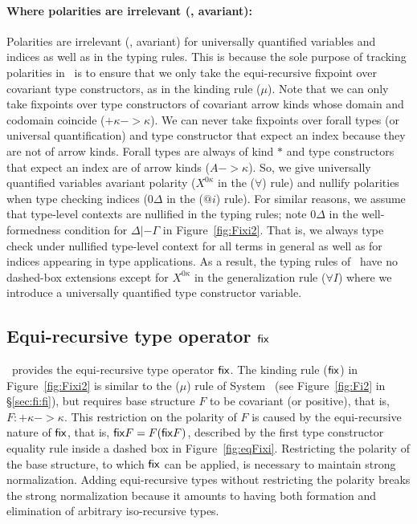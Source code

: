 \paragraph{Where polarities are irrelevant (\ie, avariant):}
Polarities are irrelevant (\ie, avariant) for universally quantified variables
and indices as well as in the typing rules. This is because the sole purpose
of tracking polarities in \Fixi\ is to ensure that we only take
the equi-recursive fixpoint over covariant type constructors, as in
the kinding rule ($\mu$).
Note that we can only take fixpoints over type constructors of covariant
arrow kinds whose domain and codomain coincide ($+\kappa -> \kappa$).
We can never take fixpoints over forall types (or universal quantification)
and type constructor that expect an index because they are not of arrow kinds.
Forall types are always of kind $*$ and type constructors that expect an index
are of arrow kinds ($A -> \kappa$). So, we give universally quantified variables
avariant polarity ($X^{0\kappa}$ in the ($\forall$) rule) and nullify polarities
when type checking indices ($0\Delta$ in the ($@i$) rule). For similar reasons,
we assume that type-level contexts are nullified in the typing rules;
note $0\Delta$ in the well-formedness condition for $\Delta |- \Gamma$
in Figure~\ref{fig:Fixi2}. That is, we always type check under nullified
type-level context for all terms in general as well as for indices appearing
in type applications. As a result, the typing rules of \Fixi\ have no dashed-box
extensions except for $X^{0\kappa}$ in the generalization rule ($\forall$$I$)
where we introduce a universally quantified type constructor variable.

\subsection{Equi-recursive type operator $\mathsf{fix}$}
\label{ssec:fixi:def:equirec}
\Fixi\ provides the equi-recursive type operator $\mathsf{fix}$.
The kinding rule ($\mathsf{fix}$) in Figure~\ref{fig:Fixi2} is similar to
the ($\mu$) rule of System \Fi\ (see Figure~\ref{fig:Fi2} in \S\ref{sec:fi:fi}),
but requires base structure $F$ to be covariant (or positive), that is,
$F : +\kappa -> \kappa$. This restriction on the polarity of $F$ is caused by
the equi-recursive nature of $\mathsf{fix}$, that is, $\mathsf{fix} F=F(\mathsf{fix} F)$, 
described by the first type constructor equality rule inside a dashed box
in Figure~\ref{fig:eqFixi}. Restricting the polarity of the base structure,
to which $\mathsf{fix}$ can be applied, is necessary to maintain strong normalization.
Adding equi-recursive types without restricting the polarity breaks
the strong normalization because it amounts to having both formation and
elimination of arbitrary iso-recursive types.

